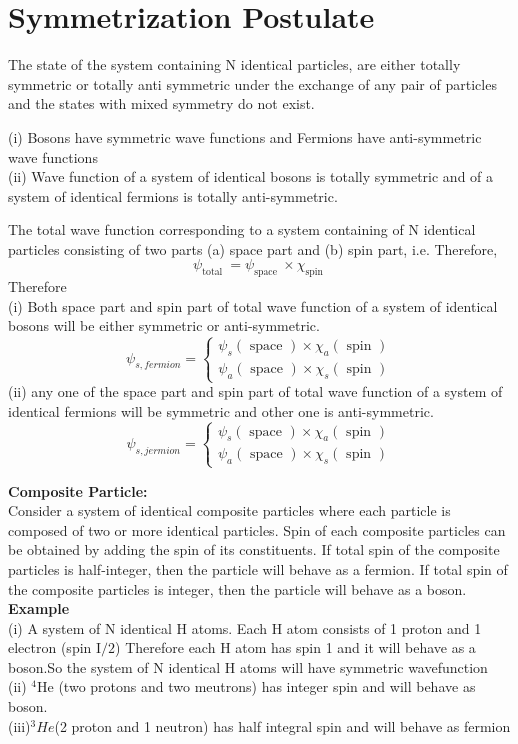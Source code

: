 \section{Symmetrization Postulate}
The state of the system containing $\mathrm{N}$ identical particles, are either totally symmetric or totally anti symmetric under the exchange of any pair of particles and the states with mixed symmetry do not exist.
\begin{note}
	(i) Bosons have symmetric wave functions and Fermions have anti-symmetric wave functions\\
	(ii) Wave function of a system of identical bosons is totally symmetric and of a system of identical fermions is totally anti-symmetric.
	
	The total wave function corresponding to a system containing of $\mathrm{N}$ identical particles consisting of two parts (a) space part and (b) spin part, i.e.
	Therefore,
	$$
	\psi_{\text {total }}=\psi_{\text {space }} \times \chi_{\text {spin }}
	$$
	Therefore\\
	(i) Both space part and spin part of total wave function of a system of identical bosons will be either symmetric or anti-symmetric.
	$$
	\psi_{s, f e r m i o n}=\left\{\begin{array}{l}
	\psi_{s}(\text { space }) \times \chi_{a}(\text { spin }) \\
	\psi_{a}(\text { space }) \times \chi_{s}(\text { spin })
	\end{array}\right.
	$$
	(ii) any one of the space part and spin part of total wave function of a system of identical fermions will be symmetric and other one is anti-symmetric.
	$$
	\psi_{s, j e r m i o n}=\left\{\begin{array}{l}
	\psi_{s}(\text { space }) \times \chi_{a}(\text { spin }) \\
	\psi_{a}(\text { space }) \times \chi_{s}(\text { spin })
	\end{array}\right.
	$$
	\end{note}
	\textbf{Composite Particle:}\\
Consider a system of identical composite particles where each particle is composed of two or more identical particles. Spin of each composite particles can be obtained by adding the spin of its constituents. If total spin of the composite particles is half-integer, then the particle will behave as a fermion. If total spin of the composite particles is integer, then the particle will behave as a boson.\\
\textbf{Example} \\
(i) A system of $\mathrm{N}$ identical $\mathrm{H}$ atoms. Each $\mathrm{H}$ atom consists of 1 proton and 1 electron (spin $\mathrm{I} / 2$) Therefore each H atom has spin 1 and it will behave as a boson.So the system of N identical H atoms will have symmetric wavefunction\\
(ii) ${ }^{4} \mathrm{He}$ (two protons and two meutrons) has integer spin and will behave as boson.\\
(iii)$^3He$(2 proton and 1 neutron) has half integral spin and will behave as fermion
